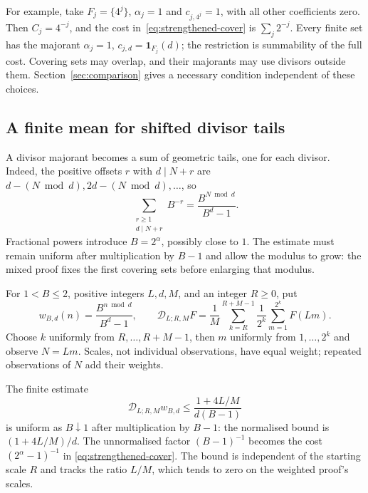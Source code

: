 \documentclass[11pt]{article}
\begin{document}
For example, take $F_j=\{4^j\}$, $\alpha_j=1$ and $c_{j,4^j}=1$,
with all other coefficients zero. Then $C_j=4^{-j}$, and the cost
in~\eqref{eq:strengthened-cover} is $\sum_j2^{-j}$. Every finite set
has the majorant $\alpha_j=1$, $c_{j,d}=\mathbf1_{F_j}(d)$;
the restriction is summability of the full cost. Covering sets may
overlap, and their majorants may use divisors outside them.
Section~\ref{sec:comparison} gives a necessary condition independent
of these choices.

\subsection{A finite mean for shifted divisor tails}
A divisor majorant becomes a sum of geometric tails, one for each
divisor. Indeed, the positive offsets $r$ with $d\mid N+r$ are
$d-(N\bmod d),2d-(N\bmod d),\ldots$, so
\[
 \sum_{\substack{r\ge1\\d\mid N+r}}B^{-r}
 =\frac{B^{N\bmod d}}{B^d-1}.
\]
Fractional powers introduce $B=2^\alpha$, possibly close to $1$.
The estimate must remain uniform after multiplication by $B-1$ and
allow the modulus to grow: the mixed proof fixes the first covering
sets before enlarging that modulus.

For $1<B\le2$, positive integers $L,d,M$, and an integer $R\ge0$, put
\[
 w_{B,d}(n)=\frac{B^{n\bmod d}}{B^d-1},\qquad
 \mathscr D_{L;R,M}F
 =\frac1M\sum_{k=R}^{R+M-1}\frac1{2^k}
      \sum_{m=1}^{2^k}F(Lm).
\]
Choose $k$ uniformly from $R,\ldots,R+M-1$, then $m$ uniformly
from $1,\ldots,2^k$ and observe $N=Lm$. Scales, not individual
observations, have equal weight; repeated observations of $N$ add
their weights.

The finite estimate
\begin{equation*}
 \mathscr D_{L;R,M}w_{B,d}
 \le\frac{1+4L/M}{d(B-1)}
 \tag{S}\label{eq:mixed-finite-kernel}
\end{equation*}
is uniform as $B\downarrow1$ after multiplication by $B-1$:
the normalised bound is $(1+4L/M)/d$. The unnormalised factor
$(B-1)^{-1}$ becomes the cost $(2^\alpha-1)^{-1}$ in
\eqref{eq:strengthened-cover}. The bound is independent of the starting
scale $R$ and tracks the ratio $L/M$, which tends to zero on the
weighted proof's scales.
\end{document}
